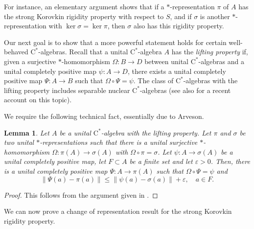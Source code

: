 \documentclass[10pt]{amsart}
\newcommand{\rC}{\mathrm{C}}
\newcommand{\eps}{\varepsilon}
\newtheorem{lemma}{Lemma}[section]
\theoremstyle{definition}
\begin{document}
For instance, an elementary argument shows that if a $*$-representation $\pi$ of $A$ has the strong Korovkin rigidity property with respect to $S$, and if $\sigma$ is another $*$-representation with $\ker \sigma=\ker \pi$, then $\sigma$ also has this rigidity property.




Our next goal is to show that a more powerful  statement holds for certain well-behaved $\rC^*$-algebras. Recall that a unital $\rC^*$-algebra $A$ has the \emph{lifting property} if, given a surjective $*$-homomorphism $\Omega: B\rightarrow D$ between unital $\rC^*$-algebras and a unital completely positive map $\psi: A\rightarrow D$, there exists a unital completely positive map $\Psi:A\rightarrow B$ such that $\Omega\circ\Psi = \psi$. The class of $\rC^*$-algebras with the lifting property includes separable nuclear $\rC^*$-algebras \cite{choi1976completely} (see also \cite{pisier2020non} for a recent account on this topic).

We require the following technical fact, essentially due to Arveson.

\begin{lemma}\label{L:lift}
Let $A$ be a unital $\rC^*$-algebra with the lifting property. Let $\pi$ and $\sigma$ be two unital $*$-representations such that there is a unital surjective $*$-homomorphism $\Omega:\pi(A)\to \sigma(A)$ with $\Omega\circ \pi=\sigma$. Let $\psi:A\to \sigma(A)$ be a unital completely positive map, let $F\subset A$ be a finite set and let $\eps>0$. Then, there is a unital completely positive map $\Psi:A\to \pi(A)$ such that $\Omega\circ \Psi=\psi$ and
\[
\|\Psi(a)-\pi(a)\|\leq \| \psi(a)-\sigma(a)\|+\eps, \quad a\in F.
\]
\end{lemma}
\begin{proof}
This follows from the argument given in \cite[Lemma 3.1]{arveson1977notes}.
\end{proof}

We can now prove a change of representation result for the strong Korovkin rigidity property.
\end{document}
